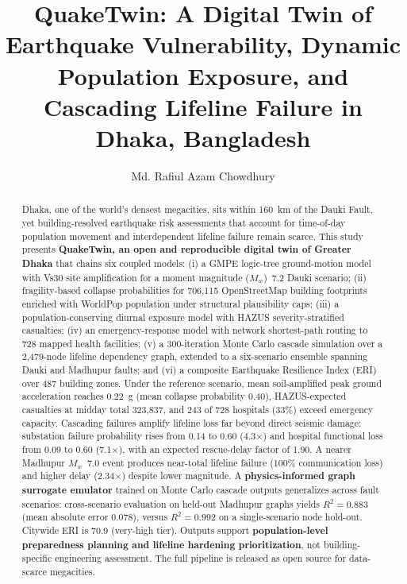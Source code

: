 \documentclass[a4paper,fleqn]{cas-sc}
\begin{document}
\let\WriteBookmarks\relax
\def\printorcid{}


\title[mode=title]{QuakeTwin: A Digital Twin of Earthquake Vulnerability,
Dynamic Population Exposure, and Cascading Lifeline Failure in Dhaka,
Bangladesh}

\author[1]{Md. Rafiul Azam Chowdhury}

\begin{abstract}
Dhaka, one of the world's densest megacities, sits within 160~km of the Dauki
Fault, yet building-resolved earthquake risk assessments that account for
time-of-day population movement and interdependent lifeline failure remain
scarce. This study presents \textbf{QuakeTwin, an open and reproducible
digital twin of Greater Dhaka} that chains six coupled models: (i) a
GMPE logic-tree ground-motion model with Vs30 site amplification for a
moment magnitude ($M_w$)~7.2 Dauki scenario; (ii) fragility-based collapse
probabilities for 706{,}115 OpenStreetMap building footprints enriched with
WorldPop population under structural plausibility caps; (iii) a
population-conserving diurnal exposure model with HAZUS
severity-stratified casualties; (iv) an emergency-response model with
network shortest-path routing to 728 mapped health facilities; (v) a
300-iteration Monte Carlo cascade simulation over a 2{,}479-node lifeline
dependency graph, extended to a six-scenario ensemble spanning Dauki and
Madhupur faults; and (vi) a composite Earthquake Resilience Index (ERI)
over 487 building zones. Under the reference scenario, mean
soil-amplified peak ground acceleration reaches 0.22~g (mean collapse
probability 0.40), HAZUS-expected casualties at midday total 323{,}837, and
243 of 728 hospitals (33\%) exceed emergency capacity. Cascading failures
amplify lifeline loss far beyond direct seismic damage: substation failure
probability rises from 0.14 to 0.60 (4.3$\times$) and hospital functional
loss from 0.09 to 0.60 (7.1$\times$), with an expected rescue-delay factor
of 1.90. A nearer Madhupur $M_w$~7.0 event produces near-total lifeline
failure (100\% communication loss) and higher delay (2.34$\times$) despite
lower magnitude. A \textbf{physics-informed graph surrogate emulator}
trained on Monte Carlo cascade outputs generalizes across fault scenarios:
cross-scenario evaluation on held-out Madhupur graphs yields
$R^2 = 0.883$ (mean absolute error 0.078), versus $R^2 = 0.992$ on a
single-scenario node hold-out. Citywide ERI is 70.9 (very-high tier).
Outputs support \textbf{population-level preparedness planning and lifeline
hardening prioritization}, not building-specific engineering assessment.
The full pipeline is released as open source for data-scarce megacities.
\end{abstract}
\end{document}
